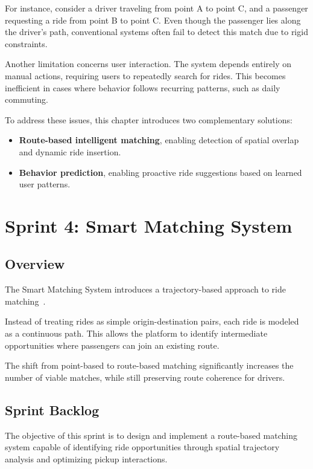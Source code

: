 For instance, consider a driver traveling from point A to point C, and a passenger requesting a ride from point B to point C. Even though the passenger lies along the driver’s path, conventional systems often fail to detect this match due to rigid constraints.

Another limitation concerns user interaction. The system depends entirely on manual actions, requiring users to repeatedly search for rides. This becomes inefficient in cases where behavior follows recurring patterns, such as daily commuting.

To address these issues, this chapter introduces two complementary solutions:

\begin{itemize}
    \item \textbf{Route-based intelligent matching}, enabling detection of spatial overlap and dynamic ride insertion.
    \item \textbf{Behavior prediction}, enabling proactive ride suggestions based on learned user patterns.
\end{itemize}

\section{Sprint 4: Smart Matching System}

\subsection{Overview}

The Smart Matching System introduces a trajectory-based approach to ride matching~\cite{stiglic2015flexible}.

Instead of treating rides as simple origin-destination pairs, each ride is modeled as a continuous path. This allows the platform to identify intermediate opportunities where passengers can join an existing route.

The shift from point-based to route-based matching significantly increases the number of viable matches, while still preserving route coherence for drivers.

\subsection{Sprint Backlog}

The objective of this sprint is to design and implement a route-based matching system capable of identifying ride opportunities through spatial trajectory analysis and optimizing pickup interactions.

